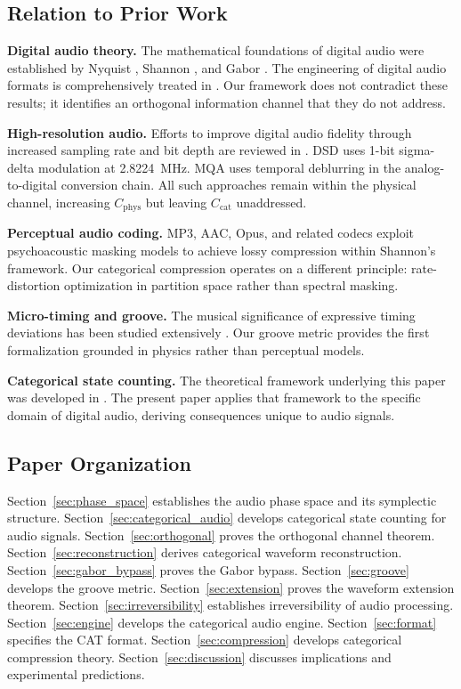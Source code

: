 \documentclass[twocolumn,10pt]{article}
\theoremstyle{remark}
\newcommand{\Ccat}{C_{\mathrm{cat}}}
\newcommand{\Cphys}{C_{\mathrm{phys}}}
\begin{document}
\subsection{Relation to Prior Work}

\textbf{Digital audio theory.} The mathematical foundations of digital audio were established by Nyquist \cite{nyquist1928}, Shannon \cite{shannon1949}, and Gabor \cite{gabor1946}. The engineering of digital audio formats is comprehensively treated in \cite{pohlmann2010, watkinson2001}. Our framework does not contradict these results; it identifies an orthogonal information channel that they do not address.

\textbf{High-resolution audio.} Efforts to improve digital audio fidelity through increased sampling rate and bit depth are reviewed in \cite{stuart2014mqa}. DSD \cite{sony1999dsd} uses 1-bit sigma-delta modulation at 2.8224~MHz. MQA \cite{stuart2014mqa} uses temporal deblurring in the analog-to-digital conversion chain. All such approaches remain within the physical channel, increasing $\Cphys$ but leaving $\Ccat$ unaddressed.

\textbf{Perceptual audio coding.} MP3, AAC, Opus, and related codecs exploit psychoacoustic masking models \cite{zwicker2007, moore2012} to achieve lossy compression within Shannon's framework. Our categorical compression operates on a different principle: rate-distortion optimization in partition space rather than spectral masking.

\textbf{Micro-timing and groove.} The musical significance of expressive timing deviations has been studied extensively \cite{bilmes1993, friberg2002, madison2011, iyer2002, honing2012, butterfield2010}. Our groove metric provides the first formalization grounded in physics rather than perceptual models.

\textbf{Categorical state counting.} The theoretical framework underlying this paper was developed in \cite{sachikonye2026counting, sachikonye2026thermodynamics, sachikonye2026catscript}. The present paper applies that framework to the specific domain of digital audio, deriving consequences unique to audio signals.

\subsection{Paper Organization}

Section~\ref{sec:phase_space} establishes the audio phase space and its symplectic structure. Section~\ref{sec:categorical_audio} develops categorical state counting for audio signals. Section~\ref{sec:orthogonal} proves the orthogonal channel theorem. Section~\ref{sec:reconstruction} derives categorical waveform reconstruction. Section~\ref{sec:gabor_bypass} proves the Gabor bypass. Section~\ref{sec:groove} develops the groove metric. Section~\ref{sec:extension} proves the waveform extension theorem. Section~\ref{sec:irreversibility} establishes irreversibility of audio processing. Section~\ref{sec:engine} develops the categorical audio engine. Section~\ref{sec:format} specifies the CAT format. Section~\ref{sec:compression} develops categorical compression theory. Section~\ref{sec:discussion} discusses implications and experimental predictions.
\end{document}

